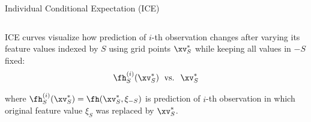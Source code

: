 \documentclass[11pt,compress,t,notes=noshow, aspectratio=169, xcolor=table]{beamer}
\begin{document}
\begin{frame}{Individual Conditional Expectation (ICE) }
\begin{columns}[T]
\begin{column}{0.84\textwidth}
\medskip

ICE curves visualize how prediction of $i$-th observation changes after varying its feature values indexed by $S$ using grid points $\xv_S^*$ while keeping all values in $-S$ fixed:
$$\fh_{S}^{(i)}(\xv_S^*) \; \text{ vs. } \; \xv_S^*$$

where $\fh_{S}^{(i)}(\xv_S^*) = \fh(\xv_S^*, \xi_{-S})$ is prediction of $i$-th observation in which original feature value $\xi_S$ was replaced by $\xv_S^*$.


\end{column}
\end{columns}



%
\end{frame}
\end{document}
